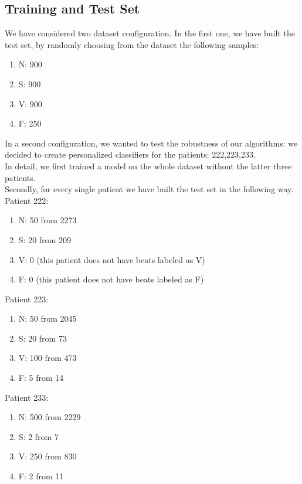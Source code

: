 \documentclass[LaM,binding=0.6cm]{sapthesis}
\begin{document}
\subsection{Training and Test Set}
We have considered two dataset configuration. In the first one, we have built the test set, by randomly choosing from the dataset the following samples:
\begin{enumerate}
\item N: 900
\item S: 900
\item V: 900
\item F: 250
\end{enumerate}
In a second configuration, we wanted to test the robustness of our algorithms: we decided to create personalized classifiers for the patients: 222,223,233.\\In detail, we first trained a model on the whole dataset without the latter three patients.\\Secondly, for every single patient we have built the test set in the following way.\\Patient 222:
\begin{enumerate}
\item N: 50 from 2273
\item S: 20 from 209
\item V: 0 (this patient does not have beats labeled as V)
\item F: 0 (this patient does not have beats labeled as F)
\end{enumerate}
Patient 223:
\begin{enumerate}
\item N: 50 from 2045
\item S: 20 from 73
\item V: 100 from 473
\item F: 5 from 14
\end{enumerate}
Patient 233:
\begin{enumerate}
\item N: 500 from 2229
\item S: 2 from 7
\item V: 250 from 830
\item F: 2 from 11
\end{enumerate}
\end{document}
